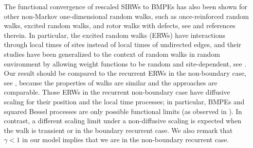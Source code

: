 \documentclass[EJP]{ejpecp} %
\begin{document}
The functional convergence of rescaled SIRWs to BMPEs has also been shown for other non-Markov one-dimensional random walks,
such as once-reinforced random walks, excited random walks, and rotor walks with defects, see \cite{Dav96,Dav99,DK12,KP16,KMP22,HLSH18} and references therein. 
In particular, the excited random walks (ERWs) have interactions through local times of sites instead of local times of undirected edges, and their studies have been generalized to the context of random walks in random environment by allowing weight functions to be random and site-dependent, 
see \cite{KZ13, KMP22}.
Our result should be compared to the recurrent ERWs in the non-boundary case, see \cite{KP16,KMP23}, because the properties of walks are similar and the approaches are comparable. 
Those ERWs in the recurrent non-boundary case have diffusive scaling for their position and the local time processes; in particular, BMPEs and squared Bessel processes are only possible functional limits (as observed in \cite{T96}). In contrast, a different scaling limit under a non-diffusive scaling is expected when the walk is transient or in the boundary recurrent case. We also remark that $\gamma<1$ in our model implies that we are in the non-boundary recurrent case.
\end{document}
